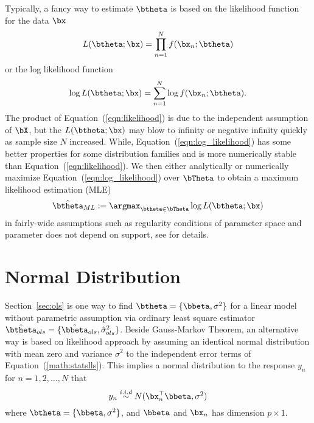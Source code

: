 Typically, a fancy way to estimate $\btheta$ is based on the
likelihood function for the data $\bx$
\begin{equation}
L(\btheta; \bx) = \prod_{n = 1}^N f(\bx_n; \btheta)
\label{eqn:likelihood}
\end{equation}
or the log likelihood function
\begin{equation}
\log L(\btheta; \bx) = \sum_{n = 1}^N \log f(\bx_n; \btheta).
\label{eqn:log_likelihood}
\end{equation}
The product of Equation~(\ref{eqn:likelihood}) is due to the independent
assumption of $\bX$, but the $L(\btheta; \bx)$ may blow to infinity
or negative infinity quickly as sample size $N$ increased. While,
Equation~(\ref{eqn:log_likelihood}) has some
better properties for some distribution families and
is more numerically stable than Equation~(\ref{eqn:likelihood}).
We then either analytically or numerically maximize
Equation~(\ref{eqn:log_likelihood})
over $\bTheta$ to obtain a maximum likelihood estimation
(MLE)
$$
  \hat{\btheta}_{ML} := \argmax_{\btheta\in\bTheta} \log L(\btheta; \bx)
$$
in fairly-wide assumptions such as regularity conditions of parameter space
and parameter does not depend on support,
see \citet{Casella2001} for details.




\section{Normal Distribution}
\label{sec:normal_distribution}

Section~\ref{sec:ols} is one way to find
$\btheta = \{\bbeta,\sigma^2\}$ for a linear model
without parametric assumption via ordinary least square estimator
$\hat{\btheta}_{ols} = \{\hat{\bbeta}_{ols},\hat{\sigma}_{ols}^2\}$.
Beside Gauss-Markov Theorem,
an alternative way is based on likelihood approach by
assuming an identical normal distribution with mean zero and
variance $\sigma^2$ to the independent error terms of
Equation~(\ref{math:statslls}).
This implies a normal distribution
to the response $y_n$ for $n=1,2,\ldots, N$ that
\begin{equation}
y_n \stackrel{i.i.d}{\sim} N(\bx_n^\top\bbeta, \sigma^2)
\label{eqn:normal}
\end{equation}
where $\btheta = \{\bbeta, \sigma^2\}$, and
$\bbeta$ and $\bx_n$ has dimension $p\times 1$.

